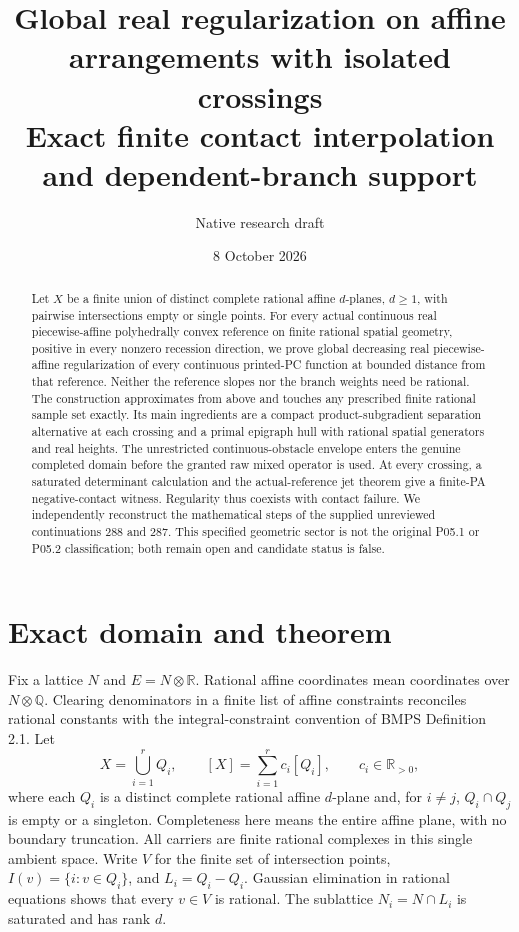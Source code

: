 \documentclass[11pt]{article}
\title{Global real regularization on affine arrangements with isolated crossings\\\large Exact finite contact interpolation and dependent-branch support}
\author{Native research draft}
\date{8 October 2026}
\newcommand{\R}{\mathbb R}
\newcommand{\Q}{\mathbb Q}
\begin{document}
\maketitle
\begin{abstract}
Let $X$ be a finite union of distinct complete rational affine $d$-planes, $d\geq1$, with pairwise intersections empty or single points. For every actual continuous real piecewise-affine polyhedrally convex reference on finite rational spatial geometry, positive in every nonzero recession direction, we prove global decreasing real piecewise-affine regularization of every continuous printed-PC function at bounded distance from that reference. Neither the reference slopes nor the branch weights need be rational. The construction approximates from above and touches any prescribed finite rational sample set exactly. Its main ingredients are a compact product-subgradient separation alternative at each crossing and a primal epigraph hull with rational spatial generators and real heights. The unrestricted continuous-obstacle envelope enters the genuine completed domain before the granted raw mixed operator is used. At every crossing, a saturated determinant calculation and the actual-reference jet theorem give a finite-PA negative-contact witness. Regularity thus coexists with contact failure. We independently reconstruct the mathematical steps of the supplied unreviewed continuations 288 and 287. This specified geometric sector is not the original P05.1 or P05.2 classification; both remain open and candidate status is false.
\end{abstract}

\section{Exact domain and theorem}
Fix a lattice $N$ and $E=N\otimes\R$. Rational affine coordinates mean coordinates over $N\otimes\Q$. Clearing denominators in a finite list of affine constraints reconciles rational constants with the integral-constraint convention of BMPS Definition 2.1. Let
\[
 X=\bigcup_{i=1}^r Q_i,\qquad [X]=\sum_{i=1}^r c_i[Q_i],\qquad c_i\in\R_{>0},
\]
where each $Q_i$ is a distinct complete rational affine $d$-plane and, for $i\ne j$, $Q_i\cap Q_j$ is empty or a singleton. Completeness here means the entire affine plane, with no boundary truncation. All carriers are finite rational complexes in this single ambient space. Write $V$ for the finite set of intersection points, $I(v)=\{i:v\in Q_i\}$, and $L_i=Q_i-Q_i$. Gaussian elimination in rational equations shows that every $v\in V$ is rational. The sublattice $N_i=N\cap L_i$ is saturated and has rank $d$.
\end{document}
